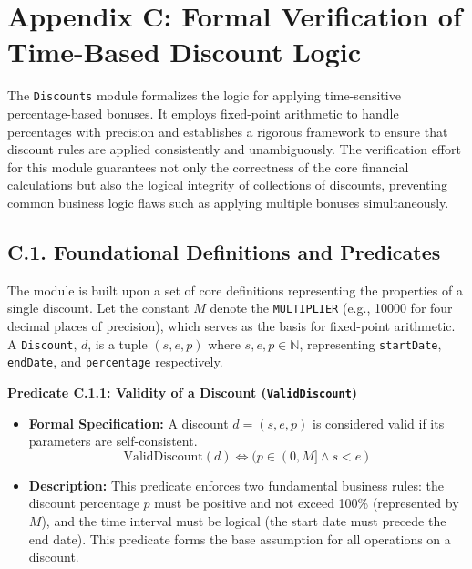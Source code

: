 \documentclass[
  english,
  onecolumn]{article}
\providecommand{\tightlist}{%
  \setlength{\itemsep}{0pt}\setlength{\parskip}{0pt}}
\begin{document}
\section{Appendix C: Formal Verification of Time-Based Discount
Logic}\label{appendix-c-formal-verification-of-time-based-discount-logic}

The \texttt{Discounts} module formalizes the logic for applying
time-sensitive percentage-based bonuses. It employs fixed-point
arithmetic to handle percentages with precision and establishes a
rigorous framework to ensure that discount rules are applied
consistently and unambiguously. The verification effort for this module
guarantees not only the correctness of the core financial calculations
but also the logical integrity of collections of discounts, preventing
common business logic flaws such as applying multiple bonuses
simultaneously.

\subsection{C.1. Foundational Definitions and
Predicates}\label{c.1.-foundational-definitions-and-predicates}

The module is built upon a set of core definitions representing the
properties of a single discount. Let the constant \(M\) denote the
\texttt{MULTIPLIER} (e.g., 10000 for four decimal places of precision),
which serves as the basis for fixed-point arithmetic. A
\texttt{Discount}, \(d\), is a tuple \((s, e, p)\) where
\(s, e, p \in \mathbb{N}\), representing \texttt{startDate},
\texttt{endDate}, and \texttt{percentage} respectively.

\textbf{Predicate C.1.1: Validity of a Discount
(\texttt{ValidDiscount})}

\begin{itemize}
\tightlist
\item
  \textbf{Formal Specification:} A discount \(d = (s, e, p)\) is
  considered valid if its parameters are self-consistent.
  \[ \text{ValidDiscount}(d) \iff (p \in (0, M] \land s < e) \]
\item
  \textbf{Description:} This predicate enforces two fundamental business
  rules: the discount percentage \(p\) must be positive and not exceed
  100\% (represented by \(M\)), and the time interval must be logical
  (the start date must precede the end date). This predicate forms the
  base assumption for all operations on a discount.
\end{itemize}
\end{document}
